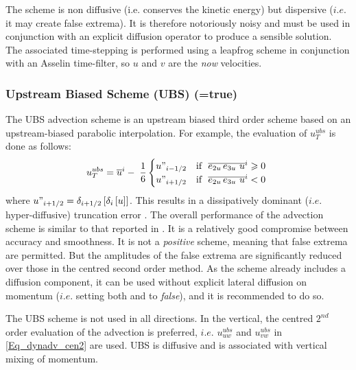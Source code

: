 \documentclass[NEMO_book]{subfiles}
\begin{document}
The scheme is non diffusive (i.e. conserves the kinetic energy) but dispersive 
($i.e.$ it may create false extrema). It is therefore notoriously noisy and must be 
used in conjunction with an explicit diffusion operator to produce a sensible solution. 
The associated time-stepping is performed using a leapfrog scheme in conjunction 
with an Asselin time-filter, so $u$ and $v$ are the \emph{now} velocities.

\subsubsection{Upstream Biased Scheme (UBS) (=true)}
\label{DYN_adv_ubs}

The UBS advection scheme is an upstream biased third order scheme based on 
an upstream-biased parabolic interpolation. For example, the evaluation of 
$u_T^{ubs} $ is done as follows:
\begin{equation} \label{Eq_dynadv_ubs}
u_T^{ubs} =\overline u ^i-\;\frac{1}{6} 	\begin{cases}
		u"_{i-1/2}& 	\text{if $\ \overline{e_{2u}\,e_{3u} \ u}^i  \geqslant 0$ } 	\\
		u"_{i+1/2}& 	\text{if $\ \overline{e_{2u}\,e_{3u} \ u}^i  < 0$ }
\end{cases}
\end{equation}
where $u"_{i+1/2} =\delta _{i+1/2} \left[ {\delta _i \left[ u \right]} \right]$. This results 
in a dissipatively dominant ($i.e.$ hyper-diffusive) truncation error \citep{Shchepetkin_McWilliams_OM05}. 
The overall performance of the advection scheme is similar to that reported in 
\citet{Farrow1995}. It is a relatively good compromise between accuracy and 
smoothness. It is not a \emph{positive} scheme, meaning that false extrema are 
permitted. But the amplitudes of the false extrema are significantly reduced over 
those in the centred second order method. As the scheme already includes 
a diffusion component, it can be used without explicit  lateral diffusion on momentum 
($i.e.$ setting both  and  to \textit{false}), 
and it is recommended to do so.

The UBS scheme is not used in all directions. In the vertical, the centred $2^{nd}$ 
order evaluation of the advection is preferred, $i.e.$ $u_{uw}^{ubs}$ and 
$u_{vw}^{ubs}$ in \eqref{Eq_dynadv_cen2} are used. UBS is diffusive and is 
associated with vertical mixing of momentum. 
\end{document}
